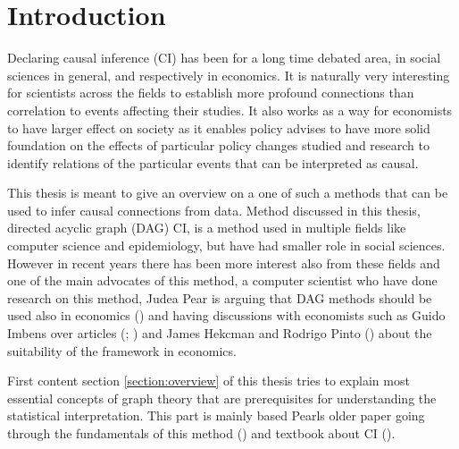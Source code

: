 \documentclass[main=english,12pt,a4paper,pdftex,econ,utf8]{aaltothesis}
\begin{document}


\section{Introduction}

Declaring causal inference (CI) has been for a long time debated area, in social sciences in general, and respectively in economics. It is naturally very interesting for scientists across the fields to establish more profound connections than correlation to events affecting their studies. It also works as a way for economists to have larger effect on society as it enables policy advises to have more solid foundation on the effects of particular policy changes studied and research to identify relations of the particular events that can be interpreted as causal.

This thesis is meant to give an overview on a one of such a methods that can be used to infer causal connections from data. Method discussed in this thesis, directed acyclic graph (DAG) CI, is a method used in multiple fields like computer science and epidemiology, but have had smaller role in social sciences. However in recent years there has been more interest also from these fields and one of the main advocates of this method, a computer scientist who have done research on this method, Judea Pear is arguing that DAG methods should be used also in economics (\cite{pearl_2014}) and having discussions with economists such as Guido Imbens over articles (\cite{Imbens2014}; \cite{imbes2020}) and James Hekcman and Rodrigo Pinto (\cite{Heckman2015}) about the suitability of the framework in economics.

First content section \ref{section:overview} of this thesis tries to explain most essential concepts of graph theory that are prerequisites for understanding the statistical interpretation. This part is mainly based Pearls older paper going through the fundamentals of this method (\cite{Pearl1998}) and textbook about CI (\cite{Peters2017}).
\end{document}
